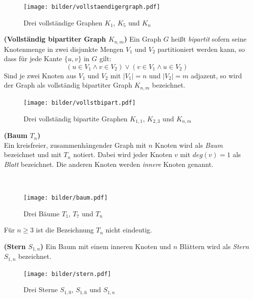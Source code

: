 \vspace{-8mm}
\begin{figure}[h!]
		\centering 		 
   \texttt{[image: bilder/vollstaendigergraph.pdf]}
	\caption{Drei vollständige Graphen $K_1$, $K_5$ und $K_n$}
  	 \end{figure}
  	 \newpage
\begin{defi}{\textbf{(Vollständig bipartiter Graph $K_{n,m}$)}}\newline
Ein Graph $G$ heißt \emph{bipartit} sofern seine Knotenmenge in zwei disjunkte Mengen $V_1$ und $V_2$ partitioniert werden kann, so dass für jede Kante $\{u,v\}$ in $G$ gilt: $$(u \in V_1 \wedge v \in V_2)\vee (v \in V_1 \wedge u \in V_2)$$Sind je zwei Knoten aus $V_1$ und $V_2$ mit $|V_1|=n$ und $|V_2|=m$ adjazent, so wird der Graph als vollständig bipartiter Graph $K_{n,m}$ bezeichnet. \end{defi}
  	 \vspace{-6mm}
\begin{figure}[h!]
		\centering 		 
   \texttt{[image: bilder/vollstbipart.pdf]}
	\caption{Drei vollständig bipartite Graphen $K_{1,1}$, $K_{2,3}$ und $K_{n,m}$}
  	 \end{figure}
\begin{defi}{\textbf{(Baum $T_n$)}}\\
Ein kreisfreier, zusammenhängender Graph mit $n$ Knoten wird als \emph{Baum} bezeichnet und mit $T_n$ notiert. Dabei wird jeder Knoten $v$ mit $deg(v)=1$ als \emph{Blatt} bezeichnet. Die anderen Knoten werden \emph{innere} Knoten genannt. \end{defi}
~\linebreak
\vspace{-13mm}
\begin{figure}[h!]
		\centering 		 
   \texttt{[image: bilder/baum.pdf]}
	\caption{Drei Bäume $T_{1}$, $T_{7}$ und $T_{n}$}
  	 \end{figure}
  	 \vspace{-4mm}
\begin{bem}
Für $n \geq 3$ ist die Bezeichnung $T_n$ nicht eindeutig.  
\end{bem}
\begin{defi}{\textbf{(Stern $S_{1,n}$)}}\newline
Ein Baum mit einem inneren Knoten und $n$ Blättern wird als \emph{Stern} $S_{1,n}$ bezeichnet. 
\label{defstern}\end{defi}
\vspace{-5mm}
\begin{figure}[h!]
		\centering 		 
   \texttt{[image: bilder/stern.pdf]}
	\caption{Drei Sterne $S_{1,0}$, $S_{1,6}$ und $S_{1,n}$}
  	 \end{figure}

